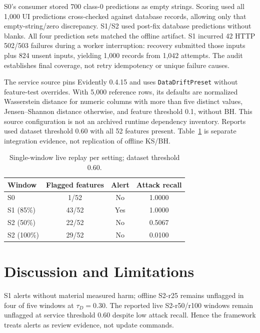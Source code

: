 \documentclass[runningheads]{llncs}
\begin{document}
S0's consumer stored 700 class-0 predictions as empty strings. Scoring used all 1,000 UI predictions cross-checked against database records, allowing only that empty-string/zero discrepancy. S1/S2 used post-fix database predictions without blanks. All four prediction sets matched the offline artifact. S1 incurred 42 HTTP 502/503 failures during a worker interruption: recovery submitted those inputs plus 824 unsent inputs, yielding 1,000 records from 1,042 attempts. The audit establishes final coverage, not retry idempotency or unique failure causes.



The service source pins Evidently 0.4.15 and uses \texttt{DataDriftPreset} without feature-test overrides. With 5,000 reference rows, its defaults are normalized Wasserstein distance for numeric columns with more than five distinct values, Jensen--Shannon distance otherwise, and feature threshold 0.1, without BH. This source configuration is not an archived runtime dependency inventory. Reports used dataset threshold 0.60 with all 52 features present. Table~\ref{tab:live} is separate integration evidence, not replication of offline KS/BH.

\begin{table}[t]
\caption{Single-window live replay per setting; dataset threshold 0.60.}
\label{tab:live}
\centering\small
\begin{tabular*}{\linewidth}{@{\extracolsep{\fill}}lccc@{}}
\toprule
Window & Flagged features & Alert & Attack recall \\
\midrule
S0 & 1/52 & No & 1.0000 \\
S1 (85\%) & 43/52 & Yes & 1.0000 \\
S2 (50\%) & 22/52 & No & 0.5067 \\
S2 (100\%) & 29/52 & No & 0.0100 \\
\bottomrule
\end{tabular*}
\end{table}

\section{Discussion and Limitations}
\label{sec:discussion}
S1 alerts without material measured harm; offline S2-r25 remains unflagged in four of five windows at $\tau_D=0.30$. The reported live S2-r50/r100 windows remain unflagged at service threshold 0.60 despite low attack recall. Hence the framework treats alerts as review evidence, not update commands.
\end{document}

